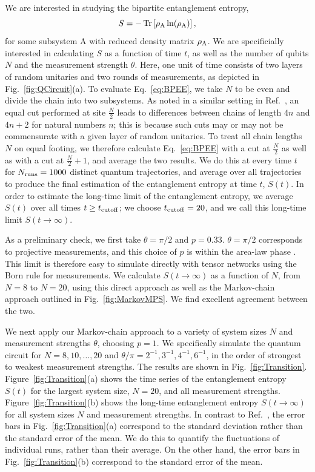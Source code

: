 \documentclass[reprint,amsmath,amssymb,aps, twocolumn, superscriptaddress, prb]{revtex4-2}
\begin{document}
We are interested in studying the bipartite entanglement entropy,
%
\begin{equation}
    S = -\Tr\left[\rho_{\rm A} \ln(\rho_{\rm A})\right], \label{eq:BPEE}
\end{equation}
% 
for some subsystem A with reduced density matrix $\rho_{\rm A}$. We are specificially interested in calculating $S$ as a function of time $t$, as well as the number of qubits $N$ and the measurement strength $\theta$. Here, one unit of time consists of two layers of random unitaries and two rounds of measurements, as depicted in Fig.~\ref{fig:QCircuit}(a). To evaluate Eq.~\eqref{eq:BPEE}, we take $N$ to be even and divide the chain into two subsystems. As noted in a similar setting in Ref.~\cite{SzyniszewskiPRB2019}, an equal cut performed at site $\frac{N}{2}$ leads to differences between chains of length $4n$ and $4n+2$ for natural numbers $n$; this is because such cuts may or may not be commensurate with a given layer of random unitaries. To treat all chain lengths $N$ on equal footing, we therefore calculate Eq.~\eqref{eq:BPEE} with a cut at $\frac{N}{2}$ as well as with a cut at $\frac{N}{2}+1$, and average the two results. We do this at every time $t$ for $N_{\rm runs} = 1000$ distinct quantum trajectories, and average over all trajectories to produce the final estimation of the entanglement entropy at time $t$, $S(t)$. In order to estimate the long-time limit of the entanglement entropy, we average $S(t)$ over all times $t \geq t_{\rm cutoff}$; we choose $t_{\rm cutoff} = 20$, and we call this long-time limit $S(t \to \infty)$. 

As a preliminary check, we first take $\theta=\pi/2$ and $p=0.33$. $\theta=\pi/2$ corresponds to projective measurements, and this choice of $p$ is within the area-law phase \cite{skinner2019measurement,MelkoPRA2021}. This limit is therefore easy to simulate directly with tensor networks using the Born rule for measurements. We calculate $S(t \to \infty)$ as a function of $N$, from $N=8$ to $N=20$, using this direct approach as well as the Markov-chain approach outlined in Fig.~\ref{fig:MarkovMPS}. We find excellent agreement between the two.

We next apply our Markov-chain approach to a variety of system sizes $N$ and measurement strengths $\theta$, choosing $p=1$. We specifically simulate the quantum circuit for $N = 8, 10, \dots, 20$ and $\theta/\pi = 2^{-1}, 3^{-1}, 4^{-1}, 6^{-1}$, in the order of strongest to weakest measurement strengths. The results are shown in Fig.~\ref{fig:Transition}. Figure~\ref{fig:Transition}(a) shows the time series of the entanglement entropy $S(t)$ for the largest system size, $N=20$, and all measurement strengths. Figure~\ref{fig:Transition}(b) shows the long-time entanglement entropy $S(t\to\infty)$ for all system sizes $N$ and measurement strengths. In contrast to Ref.~\cite{MelkoPRA2021}, the error bars in Fig.~\ref{fig:Transition}(a) correspond to the standard deviation rather than the standard error of the mean. We do this to quantify the fluctuations of individual runs, rather than their average. On the other hand, the error bars in Fig.~\ref{fig:Transition}(b) correspond to the standard error of the mean.
\end{document}
